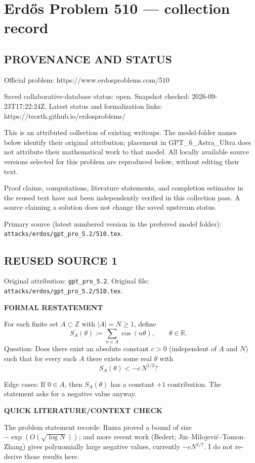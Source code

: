 \section*{Erd\H{o}s Problem 510 --- collection record}

\subsection*{PROVENANCE AND STATUS}
Official problem: https://www.erdosproblems.com/510

Saved collaborative-database status: open.
Snapshot checked: 2026-09-23T17:22:24Z.
Latest status and formalization links: https://teorth.github.io/erdosproblems/

This is an attributed collection of existing writeups. The model-folder names below identify their original attribution; placement in GPT\_6\_Astra\_Ultra does not attribute their mathematical work to that model. All locally available source versions selected for this problem are reproduced below, without editing their text.

Proof claims, computations, literature statements, and completion estimates in the reused text have not been independently verified in this collection pass. A source claiming a solution does not change the saved upstream status.

Primary source (latest numbered version in the preferred model folder): \texttt{attacks/erdos/gpt\_pro\_5.2/510.tex}.

\subsection*{REUSED SOURCE 1}
Original attribution: \texttt{gpt\_pro\_5.2}.
Original file: \texttt{attacks/erdos/gpt\_pro\_5.2/510.tex}.

\noindent\textbf{FORMAL RESTATEMENT}

For each finite set $A\subset\mathbb{Z}$ with $|A|=N\ge 1$, define
\[
S_A(\theta):=\sum_{n\in A}\cos(n\theta),\qquad \theta\in\mathbb{R}.
\]
Question: Does there exist an absolute constant $c>0$ (independent of $A$ and $N$) such that for every such $A$ there exists some real $\theta$ with
\[
S_A(\theta) < -c\,N^{1/2}?
\]

Edge cases: If $0\in A$, then $S_A(\theta)$ has a constant $+1$ contribution. The statement asks for a negative value anyway.

\medskip
\noindent\textbf{QUICK LITERATURE/CONTEXT CHECK}

The problem statement records: Ruzsa proved a bound of size $-\exp(O(\sqrt{\log N}))$; and more recent work (Bedert; Jin--Milojevi\'c--Tomon--Zhang) gives polynomially large negative values, currently $-cN^{1/7}$. I do not re-derive those results here.


